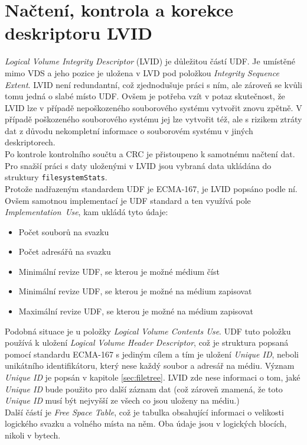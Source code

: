 \section{Načtení, kontrola a korekce deskriptoru LVID}
\label{sec:nacteni-a-oprava-lvid}
\textit{Logical Volume Integrity Descriptor} (LVID) je důležitou částí UDF. Je umístěné mimo VDS a jeho pozice je uložena v LVD pod položkou \textit{Integrity Sequence Extent}. LVID není redundantní, což zjednodušuje práci s ním, ale zároveň se kvůli tomu jedná o slabé místo UDF. Ovšem je potřeba vzít v potaz skutečnost, že LVID lze v případě nepoškozeného souborového systému vytvořit znovu zpětně. V případě poškozeného souborového systému jej lze vytvořit též, ale s rizikem ztráty dat z důvodu nekompletní informace o souborovém systému v jiných deskriptorech.\\
Po kontrole kontrolního součtu a CRC je přistoupeno k samotnému načtení dat. Pro snažší práci s daty uloženými v LVID jsou vybraná data ukládána do struktury \texttt{filesystemStats}.\\
Protože nadřazeným standardem UDF je ECMA-167, je LVID popsáno podle ní. Ovšem samotnou implementací je UDF standard a ten využívá pole \textit{Implementation~Use}, kam ukládá tyto údaje:
\begin{itemize}
    \item Počet souborů na svazku
    \item Počet adresářů na svazku
    \item Minimální revize UDF, se kterou je možné médium číst
    \item Minimální revize UDF, se kterou je možné na médium zapisovat
    \item Maximální revize UDF, se kterou je možné na médium zapisovat
\end{itemize}
Podobná situace je u položky \textit{Logical Volume Contents Use}. UDF tuto položku používá k uložení \textit{Logical Volume Header Descriptor}, což je struktura popsaná pomocí standardu ECMA-167 s jediným cílem a tím je uložení \textit{Unique ID}, neboli unikátního identifikátoru, který nese každý soubor a adresář na médiu. Význam \textit{Unique ID} je popsán v kapitole \ref{sec:filetree}. LVID zde nese informaci o tom, jaké \textit{Unique ID} bude použito pro další záznam dat (což zároveň znamená, že toto \textit{Unique ID} musí být nejvyšší ze všech co jsou uloženy na médiu.)\\
Další částí je \textit{Free Space Table}, což je tabulka obsahující informaci o velikosti logického svazku a volného místa na něm. Oba údaje jsou v logických blocích, nikoli v bytech.\\
